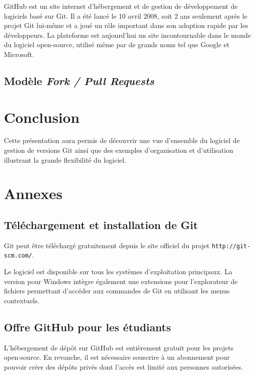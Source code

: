 \documentclass[11pt,a4paper]{article}
\begin{document}
GitHub est un site internet d'hébergement et de gestion de développement de logiciels basé sur Git.
Il a été lancé le 10 avril 2008, soit 2 ans seulement après le projet Git lui-même et a joué un rôle important dans son adoption rapide par les développeurs.
La plateforme est aujourd'hui un site incontournable dans le monde du logiciel open-source, utilisé même par de grands noms tel que Google et Microsoft. 

\subsection{Modèle \textit{Fork / Pull Requests}}

\section{Conclusion}

Cette présentation aura permis de découvrir une vue d'ensemble du logiciel de gestion de versions Git ainsi que des exemples d'organisation et d'utilisation illustrant la grande flexibilité du logiciel.

\pagebreak
{}
\section{Annexes}

\subsection{Téléchargement et installation de Git}

Git peut être téléchargé gratuitement depuis le site officiel du projet {\tt http://git-scm.com/}.

Le logiciel est disponible sur tous les systèmes d'exploitation principaux.
La version pour Windows intègre également une extensions pour l'explorateur de fichiers permettant d'accéder aux commandes de Git en utilisant les menus contextuels.

\subsection{Offre GitHub pour les étudiants}

L'hébergement de dépôt sur GitHub est entièrement gratuit pour les projets open-source.
En revanche, il est nécessaire souscrire à un abonnement pour pouvoir créer des dépôts privés dont l'accès est limité aux personnes autorisées.
\end{document}
